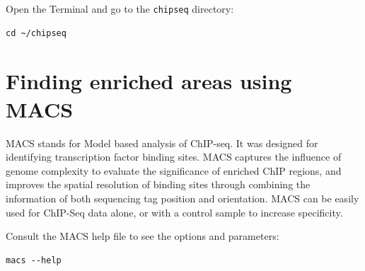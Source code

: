 \begin{steps}
Open the Terminal and go to the \texttt{chipseq} directory:
\begin{lstlisting}
cd ~/chipseq
\end{lstlisting}
\end{steps}

\section{Finding enriched areas using MACS}

\begin{information}
MACS stands for Model based analysis of ChIP-seq. It was designed for
identifying transcription factor binding sites. MACS captures the influence of
genome complexity to evaluate the significance of enriched ChIP regions, and
improves the spatial resolution of binding sites through combining the
information of both sequencing tag position and orientation. MACS can be easily
used for ChIP-Seq data alone, or with a control sample to increase specificity.
\end{information}

\begin{steps}
Consult the MACS help file to see the options and parameters:

\begin{lstlisting}
macs --help
\end{lstlisting}
\end{steps}

